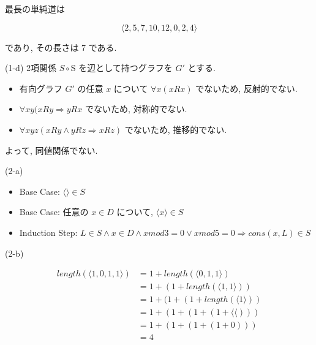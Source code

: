 \documentclass[12pt]{article}
\begin{document}
\begin{flushleft}
最長の単純道は

\[ \langle 2, 5, 7, 10, 12, 0, 2, 4 \rangle \]

であり, その長さは 7 である. \\

\vspace{5mm}

(1-d) 2項関係 $S \circ $S を辺として持つグラフを \( G' \) とする.
\begin{itemize}
    \item 有向グラフ \( G' \) の任意 \( x \) について \( \forall x (xRx) \) でないため, 反射的でない.
    \item \( \forall xy(xRy \Rightarrow yRx \) でないため, 対称的でない.
    \item \( \forall xyz(xRy \wedge yRz \Rightarrow xRz) \) でないため, 推移的でない.
\end{itemize}
よって, 同値関係でない.
\end{flushleft}

(2-a)

\begin{itemize}
    \item Base Case: \( \langle \rangle \in S \)
    \item Base Case: 任意の \( x \in D \) について, \( \langle x \rangle \in S \)
    \item Induction Step: \( L \in S \wedge x \in D \wedge x mod 3 = 0 \vee x mod 5 = 0 \Rightarrow cons(x, L) \in S \)
\end{itemize}

(2-b)

\begin{equation}
\begin{split}
length(\langle 1, 0, 1, 1 \rangle) & = 1 + length(\langle 0, 1, 1 \rangle) \\
                                   & = 1 + (1 + length(\langle 1, 1 \rangle)) \\
                                   & = 1 + (1 + (1 + length(\langle 1 \rangle)) \\
                                   & = 1 + (1 + (1 + (1 + \langle \langle))) \\
                                   & = 1 + (1 + (1 + (1 + 0))) \\
                                   & = 4
\end{split}
\end{equation}
\end{document}
